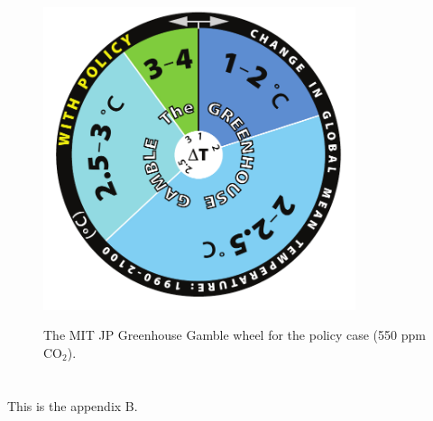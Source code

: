 \documentclass[12pt,fleqn]{article}
\begin{document}
\begin{figure}[h!]
  \centering
  \noindent\includegraphics[width=3.6in]{../figure/GHG_PolicyWheel2009.pdf}\\
  \caption{The MIT JP Greenhouse Gamble wheel for the policy case (550 ppm CO$_{2}$).}\label{fig:jpwheel550policy}
\end{figure}

\newpage

\section{}

This is the appendix B.
\end{document}
